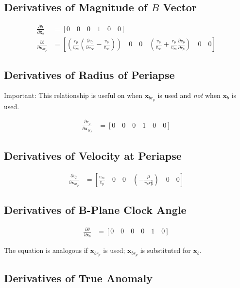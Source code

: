 \documentclass[]{article}
\newcommand{\vb}[1]{\bm{#1}} %
\newcommand{\pd}[2]{\frac{\partial #1}{\partial #2}} %
\newcommand{\xb}[0]{\vb{x}_b}
\newcommand{\xbrp}[0]{\vb{x}_{br_p}}
\newcommand{\vinfmag}[0]{v_{\infty}}
\begin{document}
\subsection{Derivatives of Magnitude of $B$ Vector}

\begin{align}
	\pd{b}{\xb} &= \left[ 0 \quad 0 \quad 0 \quad 1 \quad 0 \quad 0 \right] \\
	\pd{b}{\xbrp} &= \left[ \left( \frac{r_p}{\vinfmag} \left( \pd{v_p}{\vinfmag} - \frac{v_p}{\vinfmag} \right) \right) \quad 0 \quad 0 \quad \left( \frac{v_p}{\vinfmag} + \frac{r_p}{\vinfmag} \pd{v_p}{r_p} \right) \quad 0 \quad 0 \right]
\end{align}

\subsection{Derivatives of Radius of Periapse}

Important: This relationship is useful on when $\xbrp$ is used and \emph{not} when $\xb$ is used.

\begin{align}
\pd{r_p}{\xbrp} &= \left[ 0 \quad 0 \quad 0 \quad 1 \quad 0 \quad 0 \right]
\end{align}

\subsection{Derivatives of Velocity at Periapse}

\begin{align}
\pd{v_p}{\xbrp} &= \left[ \frac{\vinfmag}{v_p} \quad 0 \quad 0 \quad \left( -\frac{\mu}{v_p r_p^2} \right) \quad 0 \quad 0 \right]
\end{align}

\subsection{Derivatives of B-Plane Clock Angle}

\begin{align}
	\pd{\theta}{\xb} &= \left[ 0 \quad 0 \quad 0 \quad 0 \quad 1 \quad 0 \right]
\end{align}

The equation is analogous if $\xbrp$ is used; $\xbrp$ is substituted for $\xb$.

\subsection{Derivatives of True Anomaly}
\end{document}
